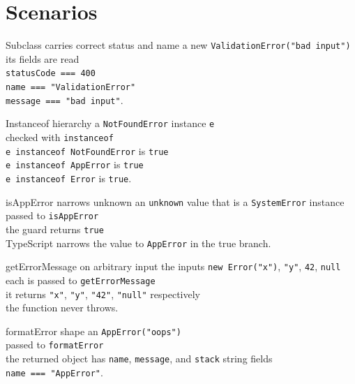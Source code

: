 \section{Scenarios}

\begin{scenario}{Subclass carries correct status and name}
\Given a new \texttt{ValidationError("bad input")} \\
\When its fields are read \\
\Then \texttt{statusCode === 400} \\
\And \texttt{name === "ValidationError"} \\
\And \texttt{message === "bad input"}.
\end{scenario}

\begin{scenario}{Instanceof hierarchy}
\Given a \texttt{NotFoundError} instance \texttt{e} \\
\When checked with \texttt{instanceof} \\
\Then \texttt{e instanceof NotFoundError} is \texttt{true} \\
\And \texttt{e instanceof AppError} is \texttt{true} \\
\And \texttt{e instanceof Error} is \texttt{true}.
\end{scenario}

\begin{scenario}{isAppError narrows unknown}
\Given an \texttt{unknown} value that is a \texttt{SystemError} instance \\
\When passed to \texttt{isAppError} \\
\Then the guard returns \texttt{true} \\
\And TypeScript narrows the value to \texttt{AppError} in the true branch.
\end{scenario}

\begin{scenario}{getErrorMessage on arbitrary input}
\Given the inputs \texttt{new Error("x")}, \texttt{"y"}, \texttt{42}, \texttt{null} \\
\When each is passed to \texttt{getErrorMessage} \\
\Then it returns \texttt{"x"}, \texttt{"y"}, \texttt{"42"}, \texttt{"null"} respectively \\
\And the function never throws.
\end{scenario}

\begin{scenario}{formatError shape}
\Given an \texttt{AppError("oops")} \\
\When passed to \texttt{formatError} \\
\Then the returned object has \texttt{name}, \texttt{message}, and \texttt{stack} string fields \\
\And \texttt{name === "AppError"}.
\end{scenario}

